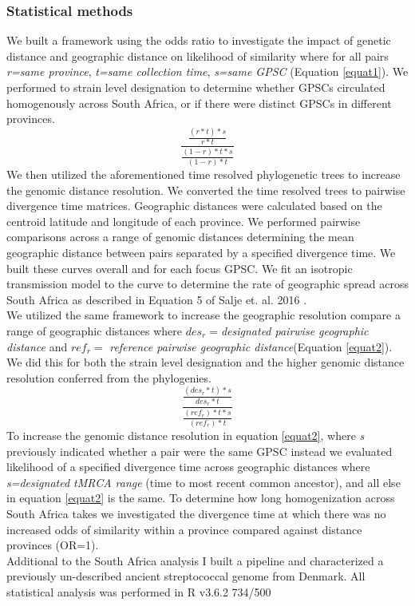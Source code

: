 \documentclass{article}
\begin{document}
\subsubsection{Statistical methods}
We built a framework using the odds ratio to investigate the impact of genetic distance and geographic distance on likelihood of similarity where for all pairs \textit{r=same province}, \textit{t=same collection time}, \textit{s=same GPSC} (Equation \ref{equat1}). We performed to strain level designation to determine whether GPSCs circulated homogenously across South Africa, or if there were distinct GPSCs in different provinces. 
\begin{equation}
\frac{\frac{(r*t)*s}{r*t}}{\frac{(1-r)*t*s}{(1-r)*t}}
\label{equat1}
\end{equation}
We then utilized the aforementioned time resolved phylogenetic trees to increase the genomic distance resolution. We converted the time resolved trees to pairwise divergence time matrices. Geographic distances were calculated based on the centroid latitude and longitude of each province. We performed pairwise comparisons across a range of genomic distances determining the mean geographic distance between pairs separated by a specified divergence time. We built these curves overall and for each focus GPSC. We fit an isotropic transmission model to the curve to determine the rate of geographic spread across South Africa as described in Equation 5 of Salje et. al. 2016 \cite{saljeEstimatingInfectiousDisease2016}. \\We utilized the same framework to increase the geographic resolution compare a range of geographic distances where $des_r=$\textit{designated pairwise geographic distance} and  $ref_r=$ \textit{reference pairwise geographic distance}(Equation \ref{equat2}). We did this for both the strain level designation and the higher genomic distance resolution conferred from the phylogenies.
\begin{equation}
\frac{\frac{(des_r*t)*s}{des_r*t}}{\frac{(ref_r)*t*s}{(ref_r)*t}} 
\label{equat2}
\end{equation}
To increase the genomic distance resolution in equation \ref{equat2}, where \textit{s} previously indicated whether a pair were the same GPSC instead we evaluated likelihood of a specified divergence time across geographic distances where \textit{s=designated tMRCA range} (time to most recent common ancestor), and all else in equation \ref{equat2} is the same. To determine how long homogenization across South Africa takes we investigated the divergence time at which there was no increased odds of similarity within a province compared against distance provinces (OR=1). \\
Additional to the South Africa analysis I built a pipeline and characterized a previously un-described ancient streptococcal genome from Denmark. 
All statistical analysis was performed in R v3.6.2
734/500
\end{document}
